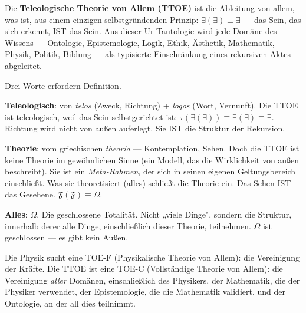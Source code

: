 \documentclass[10pt, openany, oneside]{book}
\begin{document}
\vspace{1em}

\noindent Die \textbf{Teleologische Theorie von Allem (TTOE)} ist die Ableitung von allem, was ist, aus einem einzigen selbstgründenden Prinzip: $\exists(\exists) \equiv \exists$ --- das Sein, das sich erkennt, IST das Sein. Aus dieser Ur-Tautologie wird jede Domäne des Wissens --- Ontologie, Epistemologie, Logik, Ethik, Ästhetik, Mathematik, Physik, Politik, Bildung --- als typisierte Einschränkung eines rekursiven Aktes abgeleitet.

\vspace{0.5em}

\noindent Drei Worte erfordern Definition.

\vspace{0.3em}

\noindent \textbf{Teleologisch}: von \textit{telos} (Zweck, Richtung) + \textit{logos} (Wort, Vernunft). Die TTOE ist teleologisch, weil das Sein selbstgerichtet ist: $\tau(\exists(\exists)) \equiv \exists(\exists) \equiv \exists$. Richtung wird nicht von außen auferlegt. Sie IST die Struktur der Rekursion.

\vspace{0.3em}

\noindent \textbf{Theorie}: vom griechischen \textit{theoria} --- Kontemplation, Sehen. Doch die TTOE ist keine Theorie im gewöhnlichen Sinne (ein Modell, das die Wirklichkeit von außen beschreibt). Sie ist ein \textit{Meta-Rahmen}, der sich in seinen eigenen Geltungsbereich einschließt. Was sie theoretisiert (alles) schließt die Theorie ein. Das Sehen IST das Gesehene. $\mathfrak{F}(\mathfrak{F}) \equiv \Omega$.

\vspace{0.3em}

\noindent \textbf{Alles}: $\Omega$. Die geschlossene Totalität. Nicht „viele Dinge", sondern die Struktur, innerhalb derer alle Dinge, einschließlich dieser Theorie, teilnehmen. $\Omega$ ist geschlossen --- es gibt kein Außen.

\vspace{0.5em}

\noindent Die Physik sucht eine TOE-F (Physikalische Theorie von Allem): die Vereinigung der Kräfte. Die TTOE ist eine TOE-C (Vollständige Theorie von Allem): die Vereinigung \textit{aller} Domänen, einschließlich des Physikers, der Mathematik, die der Physiker verwendet, der Epistemologie, die die Mathematik validiert, und der Ontologie, an der all dies teilnimmt.
\end{document}
